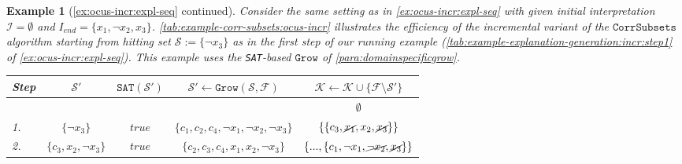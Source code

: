 \documentclass[twoside,11pt]{article}
\newcommand\m[1]{\mathcal{#1}}
\newtheorem{example}{Example}
\newcommand\Iend{\ensuremath{I_\mathit{end} }\xspace}
\newcommand\formula{\ensuremath{\m{F} }\xspace}
\newcommand\mm[1]{\ensuremath{#1}\xspace}
\newcommand\call[1]{\mm{\texttt{#1}}}
\newcommand\sat{\texttt{{SAT}}\xspace}
\newcommand\grow{\mm{\call{Grow}}}
\newcommand\corrsubsets{\mm{\call{CorrSubsets}}}
\begin{document}
\begin{example}[\cref{ex:ocus-incr:expl-seq} continued] \label{ex:correction-subset-enum}
	Consider the same setting as in \cref{ex:ocus-incr:expl-seq} with given initial interpretation $\m{I} =\emptyset$ and $\Iend = \{x_1, \lnot x_2, x_3\}$.
	\cref{tab:example-corr-subsets:ocus-incr} illustrates the efficiency of the incremental variant of the \corrsubsets algorithm starting from hitting set $\m{S} := \{\lnot x_3\}$ as in the first step of our running example (\cref{tab:example-explanation-generation:incr:step1} of \cref{ex:ocus-incr:expl-seq}). This example uses the \sat-based \grow of \cref{para:domainspecificgrow}. 
	
	\begin{table}[!h]
		\centering
		\begin{tabular}{lcccc} 
			Step & $\m{S}'$                             & $\sat(\m{S}')$    & $\m{S}' \gets \grow(\m{S}, \formula)$      & $\m{K}  \gets \m{K}  \cup \{  \formula \setminus \m{S}'\}$ \\ 
			\toprule[2pt]
			&    \phantom{$\{ c_1, c_2, x_1, \lnot x_3 \}$}    &    &      & $\emptyset$                                \\\midrule
			1. & $\{ \lnot x_3\}$                    & $\mathit{true}$  & $\{c_1, c_2, c_4, \lnot x_1, \lnot x_2, \lnot x_3 \}$            & $\{ \{c_3, \cancel{x_1}, x_2, \cancel{x_3}\}\}$                                \\\midrule
			2. & $\{c_3, x_2, \lnot x_3\}$ & $\mathit{true}$  & $\{c_2 , c_3, c_4, x_1 , x_2, \lnot x_3 \}$ & $\{ ..., \{c_1, \lnot x_1, \cancel{\lnot x_2}, \cancel{x_3}\}\}$                               \\\midrule

\end{tabular}
\end{table}
\end{example}
\end{document}
